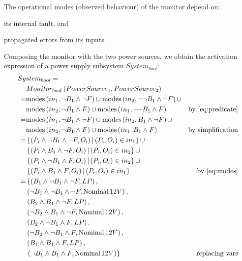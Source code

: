 The operational modes (observed behaviour) of the monitor depend on: 
\begin{alineasinline}
  \item its internal fault, and 
  \item propagated errors from its inputs.
\end{alineasinline}
%
Composing the monitor with the two power sources, we obtain the \ac{activation} expression of a power supply subsystem $System_{bool}$:
%
\begin{align*}
Sy&stem_{bool} = \\
 & Monitor_{bool} \left(PowerSource_1, PowerSource_2\right) \\
  = & \modes{in_1}{\lnot B_1 \land \lnot F} \cup
  \modes{in_2}{\lnot \lnot B_1 \land \lnot F} \cup\\
  & \modes{in_2}{\lnot B_1 \land F} \cup
  \modes{in_1}{\lnot \lnot B_1 \land F} & \text{by \cref{eq:predicate}}\\
  = &\modes{in_1}{\lnot B_1 \land \lnot F} \cup
  \modes{in_2}{ B_1 \land \lnot F} \cup\\
  &\modes{in_2}{\lnot B_1 \land F} \cup
  \modes{in_1}{B_1 \land F} & \text{by simplification}\\
  = & \left\{ \left(P_i \land \lnot B_1 \land \lnot F, O_i\right) | \left(P_i, O_i\right) \in in_1  \right\} \cup\\
  & \left\{ \left(P_i \land B_1 \land \lnot F, O_i\right) | \left(P_i, O_i\right) \in in_2  \right\} \cup\\
  & \left\{ \left(P_i \land \lnot B_1 \land F, O_i\right)| \left(P_i, O_i\right) \in in_2  \right\} \cup \\
  & \left\{ \left(P_i \land B_1 \land F, O_i\right)| \left(P_i, O_i\right) \in in_1 \right\} & \text{by \cref{eq:modes}}\\
  = & \left\{ 
      \left(B_1 \land \lnot B_1 \land \lnot F, LP\right), \right.\\
  &   \left(\lnot B_1 \land \lnot B_1 \land \lnot F, \Nominal{12V}\right), \\
  &   \left(B_2 \land B_1 \land \lnot F, LP\right),\\
  &   \left(\lnot B_2 \land B_1 \land \lnot F, \Nominal{12V}\right), \\
  &   \left(B_2 \land \lnot B_1 \land F, LP\right), \\
  &   \left(\lnot B_2 \land \lnot B_1 \land F, \Nominal{12V}\right),\\
  &   \left(B_1 \land B_1 \land F, LP\right), \\
  &   \left.\left(\lnot B_1 \land B_1 \land F, \Nominal{12V}\right)\right\}
    & \text{replacing vars}\\
\end{align*}

